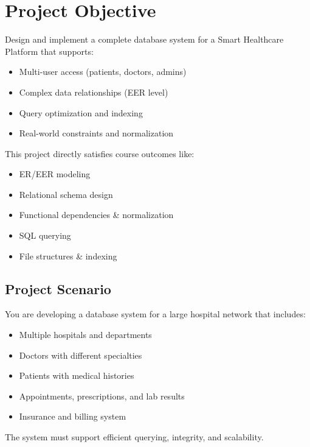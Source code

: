 \newpage
\section*{Project Objective}

Design and implement a complete database system for a Smart Healthcare Platform that supports:

\begin{itemize}
    \item Multi-user access (patients, doctors, admins)
    \item Complex data relationships (EER level)
    \item Query optimization and indexing
    \item Real-world constraints and normalization
\end{itemize}

This project directly satisfies course outcomes like:

\begin{itemize}
    \item ER/EER modeling
    \item Relational schema design
    \item Functional dependencies \& normalization
    \item SQL querying
    \item File structures \& indexing
\end{itemize}

\subsection*{Project Scenario}

You are developing a database system for a large hospital network that includes:

\begin{itemize}
    \item Multiple hospitals and departments
    \item Doctors with different specialties
    \item Patients with medical histories
    \item Appointments, prescriptions, and lab results
    \item Insurance and billing system
\end{itemize}

The system must support efficient querying, integrity, and scalability.